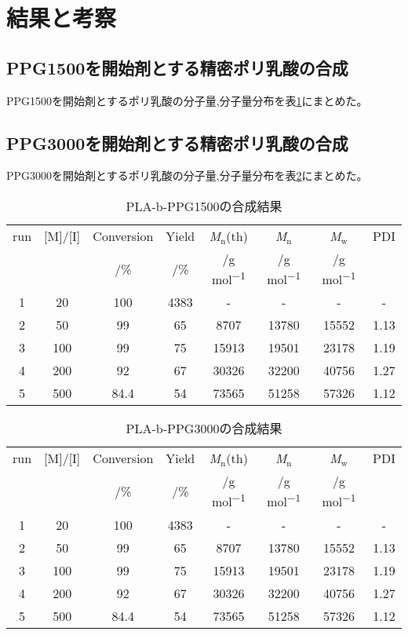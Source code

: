 \section{結果と考察}
\subsection{PPG1500を開始剤とする精密ポリ乳酸の合成}
PPG1500を開始剤とするポリ乳酸の分子量,分子量分布を表\ref{table:PLA-b-PPG1500synthesis}にまとめた。
\subsection{PPG3000を開始剤とする精密ポリ乳酸の合成}
PPG3000を開始剤とするポリ乳酸の分子量,分子量分布を表\ref{table:PLA-b-PPG3000synthesis}にまとめた。

\begin{table}[b]
    \caption{PLA-b-PPG1500の合成結果}
    \label{table:PLA-b-PPG1500synthesis}
    \centering
      \begin{tabular}{cccccccc}
        \hline
        run &  [M]/[I] & Conversion & Yield & \textit{M}${}_\textrm{n}$(th) & \textit{M}${}_\textrm{n}$ & \textit{M}${}_\textrm{w}$ & PDI\\
        &   & /\% & /\% & /\si{\g} \si{mol^{-1}} & /\si{\g} \si{mol^{-1}} & /\si{\g} \si{mol^{-1}} & \\
        \hline\hline
        1 & 20 & 100 & 4383 & - & - & - & - \\
        2 & 50 & 99 & 65 & 8707 & 13780 & 15552 & 1.13 \\
        3 & 100 & 99 & 75 & 15913 & 19501 & 23178 & 1.19\\
        4 & 200 & 92 & 67& 30326 & 32200 & 40756 & 1.27\\
        5 & 500 & 84.4 & 54 & 73565 & 51258 & 57326 & 1.12\\
        \hline
      \end{tabular}
\end{table}

\begin{table}[t]
    \caption{PLA-b-PPG3000の合成結果}
    \label{table:PLA-b-PPG3000synthesis}
    \centering
    \begin{tabular}{cccccccc}
      \hline
      run &  [M]/[I] & Conversion & Yield & \textit{M}${}_\textrm{n}$(th) & \textit{M}${}_\textrm{n}$ & \textit{M}${}_\textrm{w}$ & PDI\\
      &   & /\% & /\% & /\si{\g} \si{mol^{-1}} & /\si{\g} \si{mol^{-1}} & /\si{\g} \si{mol^{-1}} & \\
      \hline\hline
      1 & 20 & 100 & 4383 & - & - & - & - \\
      2 & 50 & 99 & 65 & 8707 & 13780 & 15552 & 1.13 \\
      3 & 100 & 99 & 75 & 15913 & 19501 & 23178 & 1.19\\
      4 & 200 & 92 & 67& 30326 & 32200 & 40756 & 1.27\\
      5 & 500 & 84.4 & 54 & 73565 & 51258 & 57326 & 1.12\\
      \hline
    \end{tabular}
\end{table}